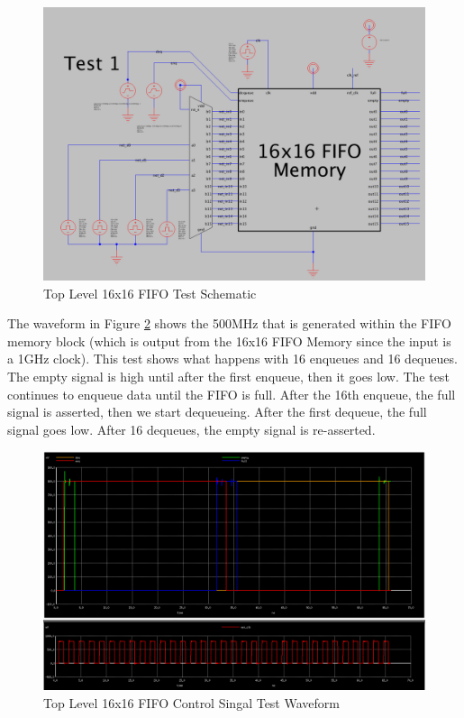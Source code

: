\documentclass[a4paper]{article}
\begin{document}
\begin{figure}[H]
	\centering
	\includegraphics[scale=0.25]{topLevelTestSchematic}
	\caption{Top Level 16x16 FIFO Test Schematic}
	\label{fig:topLevelTestSchematic}
\end{figure}

The waveform in Figure \ref{fig:topLevelTestControlWaveform} shows the 500MHz that is generated within the FIFO memory block (which is output from the 16x16 FIFO Memory since the input is a 1GHz clock). This test shows what happens with 16 enqueues and 16 dequeues. The empty signal is high until after the first enqueue, then it goes low. The test continues to enqueue data until the FIFO is full. After the 16th enqueue, the full signal is asserted, then we start dequeueing. After the first dequeue, the full signal goes low. After 16 dequeues, the empty signal is re-asserted.

\begin{figure}[H]
	\centering
	\includegraphics[scale=0.25]{topLevelTestControlWaveform}
	\caption{Top Level 16x16 FIFO Control Singal Test Waveform}
	\label{fig:topLevelTestControlWaveform}
\end{figure}
\end{document}
